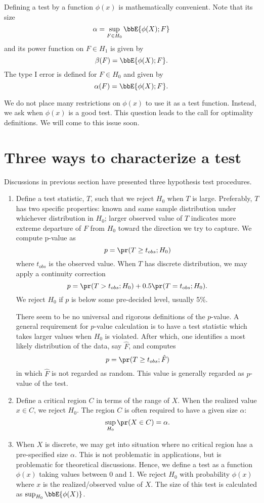 Defining a test by a function $\phi(x)$
is mathematically convenient. Note that its size
\[
\alpha = \sup_{F \in H_0} \bbE \{ \phi (X); F\}
\]
and its power function on $F \in H_1$ is given by
\[
\beta (F) = \bbE \{ \phi (X); F\}.
\]
The type I error is defined for $F \in H_0$ and given by 
\[
\alpha(F) = \bbE \{ \phi (X); F\}.
\]

We do not  place many restrictions on $\phi(x)$ to use it as a test function. 
Instead, we ask when $\phi(x)$ is a good test.
This question leads to the call for optimality definitions. 
We will come to this issue soon.

\section{Three ways to characterize a test}

Discussions in previous section have presented three 
hypothesis test procedures.

\begin{enumerate}
\item
Define a test statistic, $T$, such that we reject $H_0$ when $T$ is large.
Preferably, $T$ has two specific properties: 
known and same sample distribution under whichever distribution in $H_0$; 
larger observed value of $T$ indicates more extreme departure of $F$ from $H_0$
toward the direction we try to capture. We compute p-value as
\[ 
p = \pr ( T \geq t_{obs}; H_0)
\]
where $t_{obs}$ is the observed value. 
When $T$ has discrete distribution, we may apply a continuity correction
\[ 
p = \pr ( T > t_{obs}; H_0) + 0.5 \pr( T = t_{obs}; H_0).
\]
We reject $H_0$ if $p$ is below some pre-decided level, usually 5\%.

There seem to be no universal and rigorous definitions of the $p$-value.
A general requirement for $p$-value calculation is to have a test statistic
which takes larger values when $H_0$ is violated. After which, one identifies
a most likely distribution of the data, say $\hat F$, and computes
\[ 
p = \pr ( T \geq t_{obs}; \hat F)
\]
in which $\hat F$ is not regarded as random.
This value is generally regarded as $p$-value of the test.


\item
Define a critical region $C$ in terms of the range of $X$. When the realized value
$x \in C$, we reject $H_0$. The region $C$ is often required to have a given
size $\alpha$:
\[
\sup_{H_0}  \pr ( X \in C) = \alpha.
\]

\item
When $X$ is discrete, we may get into situation where no critical region
has a pre-specified size $\alpha$. This is not problematic in applications, 
but is problematic for theoretical discussions. Hence, we define a test as
a function $\phi(x)$ taking values between 0 and 1.
We reject $H_0$ with probability $\phi(x)$ where 
$x$ is the realized/observed value of $X$.
The size of this test is calculated as $\sup_{H_0} \bbE \{ \phi(X)\}$.
\end{enumerate}


